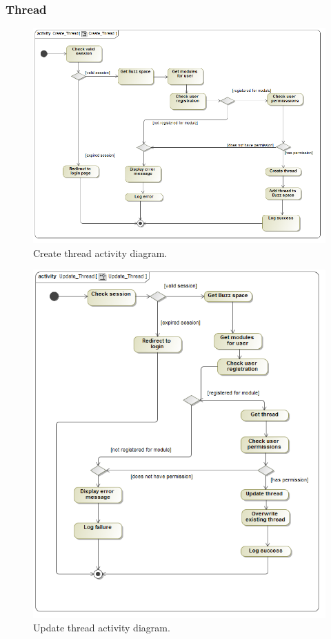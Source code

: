 \documentclass [a4paper,12pt] {article}
\begin{document}
		\subsubsection{Thread}
			\begin{figure}[H]
				\centering
				\includegraphics[width=1.0\textwidth]{CreateThreadAD.png}
				\caption{Create thread activity diagram.}
			\end{figure}
			\begin{figure}[H]
				\centering
				\includegraphics[width=1.0\textwidth]{UpdateThreadAD.png}
				\caption{Update thread activity diagram.}
			\end{figure}               
\end{document}
